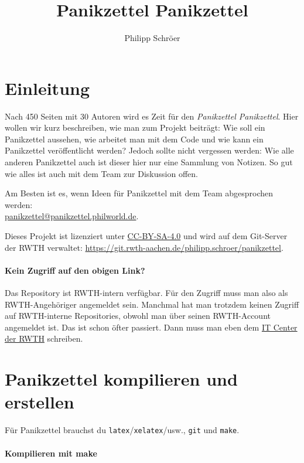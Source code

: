 \documentclass{panikzettel}
\title{Panikzettel Panikzettel}
\author{Philipp Schröer}
\begin{document}
\maketitle

\tableofcontents

\section{Einleitung}

Nach 450 Seiten mit 30 Autoren wird es Zeit für den \emph{Panikzettel Panikzettel}.
Hier wollen wir kurz beschreiben, wie man zum Projekt beiträgt: Wie soll ein Panikzettel aussehen, wie arbeitet man mit dem Code und wie kann ein Panikzettel veröffentlicht werden?
Jedoch sollte nicht vergessen werden: Wie alle anderen Panikzettel auch ist dieser hier nur eine Sammlung von Notizen.
So gut wie alles ist auch mit dem Team zur Diskussion offen.

Am Besten ist es, wenn Ideen für Panikzettel mit dem Team abgesprochen werden: \\
\href{mailto:panikzettel@panikzettel.philworld.de}{panikzettel@panikzettel.philworld.de}.

Dieses Projekt ist lizenziert unter \href{https://creativecommons.org/licenses/by-sa/4.0/}{CC-BY-SA-4.0} und wird auf dem Git-Server der RWTH verwaltet: \url{https://git.rwth-aachen.de/philipp.schroer/panikzettel}.

{\small{}
\paragraph{Kein Zugriff auf den obigen Link?}
Das Repository ist RWTH-intern verfügbar.
Für den Zugriff muss man also als RWTH-Angehöriger angemeldet sein.
Manchmal hat man trotzdem keinen Zugriff auf RWTH-interne Repositories, obwohl man über seinen RWTH-Account angemeldet ist.
Das ist schon öfter passiert.
Dann muss man eben dem \href{http://www.itc.rwth-aachen.de/cms/IT-Center/Services/kompletter-Servicekatalog/Beschaffungsportale/~estp/ServiceDesk/?lidx=1}{IT Center der RWTH} schreiben.}

\section{Panikzettel kompilieren und erstellen}

Für Panikzettel brauchst du \texttt{latex}/\texttt{xelatex}/usw., \texttt{git} und \texttt{make}.

\paragraph{Kompilieren mit make}
\end{document}
